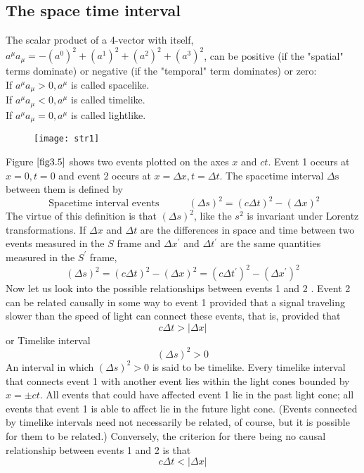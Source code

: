 \subsection{The space time interval} The scalar product of a 4-vector with itself, $a^{\mu} a_{\mu}=-\left(a^{0}\right)^{2}+\left(a^{1}\right)^{2}+\left(a^{2}\right)^{2}+\left(a^{3}\right)^{2}$, can be positive (if the "spatial" terms dominate) or negative (if the "temporal" term dominates) or zero:\\
If $a^{\mu} a_{\mu}>0, a^{\mu}$ is called spacelike.\\
If $a^{\mu} a_{\mu}<0, a^{\mu}$ is called timelike.\\
If $a^{\mu} a_{\mu}=0, a^{\mu}$ is called lightlike.
\begin{figure}[H]
	\centering
	\texttt{[image: str1]}
	\caption{}
	\label{fig3.5}
\end{figure}
 Figure $\ref{fig3.5}$ shows two events plotted on the axes $x$ and $c t$. Event 1 occurs at $x=0, t=0$ and event 2 occurs at $x=\Delta x, t=\Delta t$. The spacetime interval $\Delta \mathrm{s}$ between them is defined by\\
 $$\text{ Spacetime interval
 	events}\quad \quad \quad(\Delta s)^{2}=(c \Delta t)^{2}-(\Delta x)^{2}$$
 The virtue of this definition is that $(\Delta s)^{2}$, like the $s^{2}$  is invariant under Lorentz transformations. If $\Delta x$ and $\Delta t$ are the differences in space and time between two events measured in the $S$ frame and $\Delta x^{\prime}$ and $\Delta t^{\prime}$ are the same quantities measured in the $S^{\prime}$ frame,
$$(\Delta s)^{2}=(c \Delta t)^{2}-(\Delta x)^{2}=\left(c \Delta t^{\prime}\right)^{2}-\left(\Delta x^{\prime}\right)^{2}$$
Now let us look into the possible relationships between events 1 and 2 . Event 2 can be related causally in some way to event 1 provided that a signal traveling slower than the speed of light can connect these events, that is, provided that
$$
c \Delta t>|\Delta x|
$$
\hspace{ 5cm} or Timelike interval
$$(\Delta s)^{2}>0$$
An interval in which $(\Delta s)^{2}>0$ is said to be timelike. Every timelike interval that connects event 1 with another event lies within the light cones bounded by $x=\pm c t$. All events that could have affected event 1 lie in the past light cone; all events that event 1 is able to affect lie in the future light cone. (Events connected by timelike intervals need not necessarily be related, of course, but it is possible for them to be related.)
Conversely, the criterion for there being no causal relationship between events 1 and 2 is that
$$
c \Delta t<|\Delta x|
$$

